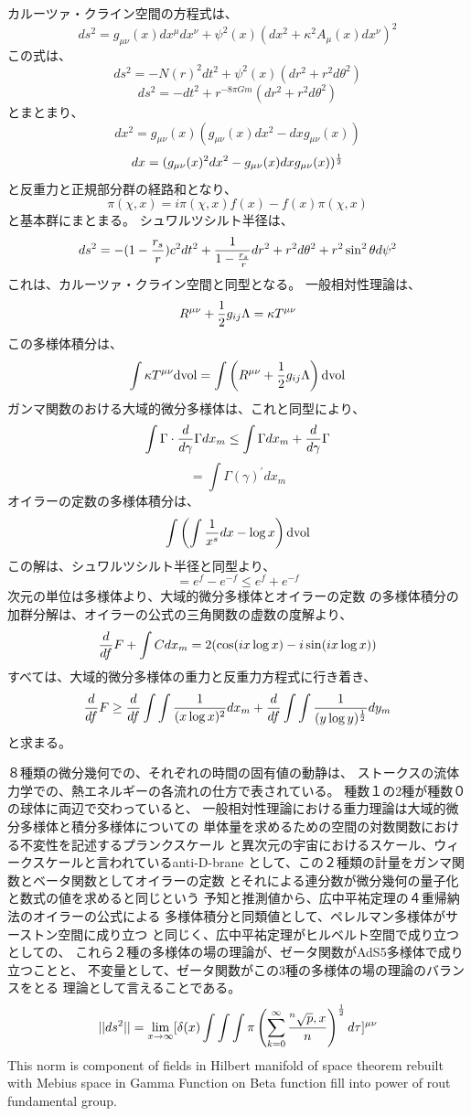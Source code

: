 \documentclass{jsarticle}
\begin{document}
{ カルーツァ・クライン空間の方程式は、
    $$ ds^2 = g_{\mu\nu}(x)dx^{\mu}dx^{\nu} + \psi^2(x)(dx^2 + \kappa^2
    A_{\mu}(x)dx^{\nu})^2 $$
    この式は、
    $$ ds^2 = -N(r)^2dt^2 + \psi^2(x)(dr^2 + r^2d\theta^2) $$
    $$ ds^2 = -dt^2 + r^{-8\pi Gm}(dr^2 + r^2d\theta^2) $$
    とまとまり、
    $$ dx^2 = g_{\mu\nu}(x)(g_{\mu\nu}(x)dx^2 - dxg_{\mu\nu}(x)) $$
    $$ dx = (g_{\mu\nu}(x)^2dx^2 - g_{\mu\nu}(x)dx g_{\mu\nu}(x))^{1 \over 2} $$
    と反重力と正規部分群の経路和となり、　
    $$ \pi(\chi, x) = i \pi (\chi, x)f(x) - f(x)  \pi (\chi, x) $$
    と基本群にまとまる。
    シュワルツシルト半径は、
    $$ ds^2 = -(1 - {r_s \over r})c^2 dt^2 + {1 \over {{1 - {r_s \over r}}}} 
    dr^2 + r^2 d \theta^2 + r^2 \sin^2 \theta d \psi^2 $$
    これは、カルーツァ・クライン空間と同型となる。
    一般相対性理論は、
    $$ R^{\mu\nu} + {1 \over 2}g_{ij}\Lambda = \kappa T^{\mu\nu} $$
    この多様体積分は、
    $$ \int \kappa T^{\mu\nu}\mathrm{dvol} = \int  \left(R^{\mu\nu} + 
    {1 \over 2}g_{ij}\Lambda\right)\mathrm{dvol}  $$
    ガンマ関数のおける大域的微分多様体は、これと同型により、
    $$ \int \Gamma \cdot {d \over {d \gamma}}{\Gamma dx_m} \le \int \Gamma
    dx_m + {d \over d \gamma}\Gamma $$
    $$ = \int \Gamma(\gamma)^{'}dx_m $$
    オイラーの定数の多様体積分は、
    $$ \int \left({{\int {1 \over x^s}}dx - \log x} \right)\mathrm{dvol} $$
    この解は、シュワルツシルト半径と同型より、
    $$ = e^f - e^{-f} \le {e^f + e^{-f}} $$
    次元の単位は多様体より、大域的微分多様体とオイラーの定数
    の多様体積分の加群分解は、オイラーの公式の三角関数の虚数の度解より、
    $$ {d \over df}F + \int C dx_m = 2 (\cos (i x \log x) 
    - i \sin (i x \log x)) $$
    すべては、大域的微分多様体の重力と反重力方程式に行き着き、
    $$ {d \over df}F \ge {d \over df}\int \int{1 \over (x \log x)^2}dx_m
    + {d \over df}\int \int{1 \over (y \log y)^{1 \over 2}}dy_m $$
    と求まる。


  ８種類の微分幾何での、それぞれの時間の固有値の動静は、
  ストークスの流体力学での、熱エネルギーの各流れの仕方で表されている。
  種数１の2種が種数０の球体に両辺で交わっていると、
一般相対性理論における重力理論は大域的微分多様体と積分多様体についての 単体量を求めるための空間の対数関数における不変性を記述するプランクスケール と異次元の宇宙におけるスケール、ウィークスケールと言われているanti-D-brane として、この２種類の計量をガンマ関数とベータ関数としてオイラーの定数 とそれによる連分数が微分幾何の量子化と数式の値を求めると同じという 予知と推測値から、広中平祐定理の４重帰納法のオイラーの公式による 多様体積分と同類値として、ペレルマン多様体がサーストン空間に成り立つ と同じく、広中平祐定理がヒルベルト空間で成り立つとしての、 これら２種の多様体の場の理論が、ゼータ関数がAdS5多様体で成り立つことと、 不変量として、ゼータ関数がこの3種の多様体の場の理論のバランスをとる
  理論として言えることである。
$$ ||ds^2|| = \lim_{x \to \infty} [\delta(x) \int \int \int \pi \left( \sum_{k=0}^{\infty}
		{{}^n\sqrt{p},x \over n} \right)
^{1 \over 2}d \tau]^{\mu\nu} $$
  This norm is component of fields in Hilbert manifold of space theorem rebuilt with
Mebius space in Gamma Function on Beta function fill into power of rout fundamental
group.

}
\end{document}
